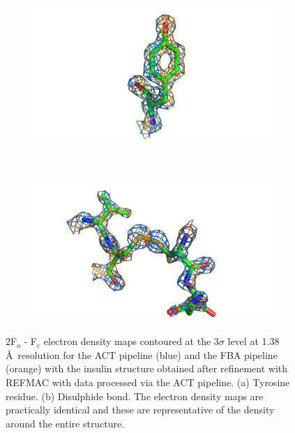\begin{figure}
	\centering
    \begin{subfigure}[b]{1.0\textwidth}
        \centering
        \includegraphics[width=\textwidth]{figures/datared/tyrosine_insulin.png}
        \caption{}
        \label{fig:Tyrosine residue - insulin}
    \end{subfigure}
    \\
	\begin{subfigure}[b]{1.0\textwidth}
        \centering
        \includegraphics[width=\textwidth]{figures/datared/disulphide_insulin.png}
        \caption{}
        \label{fig:Disulpide bond - insulin}
    \end{subfigure}
    \caption[2F$_{\text{o}}$ - F$_{\text{c}}$ electron density maps for insulin dataset.]{2F$_{\text{o}}$ - F$_{\text{c}}$ electron density maps contoured at the 3$\sigma$ level at 1.38$\,$\AA\ resolution for the ACT pipeline (blue) and the FBA pipeline (orange) with the insulin structure obtained after refinement with REFMAC with data processed via the ACT pipeline.
    (a) Tyrosine residue.
    (b) Disulphide bond.
    The electron density maps are practically identical and these are representative of the density around the entire structure.}
    \label{fig:Electron density maps - insulin}
\end{figure}

